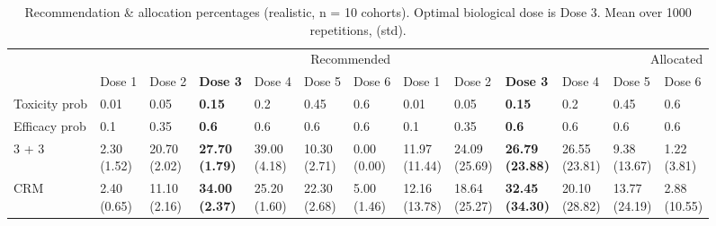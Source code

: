 \begin{table}[H]
\centering
\caption{Recommendation \& allocation percentages (realistic, n = 10 cohorts). Optimal biological dose is Dose 3. Mean over 1000 repetitions, (std).}
\label{tab:real_table2}
\begin{tabular}{lllllllllllll}
\toprule
 & \multicolumn{6}{r}{Recommended} & \multicolumn{6}{r}{Allocated} \\
 & Dose 1 & Dose 2 & \bfseries Dose 3 & Dose 4 & Dose 5 & Dose 6 & Dose 1 & Dose 2 & \bfseries Dose 3 & Dose 4 & Dose 5 & Dose 6 \\
\midrule
Toxicity prob & 0.01 & 0.05 & {\cellcolor[HTML]{C8E6C9}} \bfseries 0.15 & 0.2 & 0.45 & 0.6 & 0.01 & 0.05 & {\cellcolor[HTML]{C8E6C9}} \bfseries 0.15 & 0.2 & 0.45 & 0.6 \\
Efficacy prob & 0.1 & 0.35 & {\cellcolor[HTML]{C8E6C9}} \bfseries 0.6 & 0.6 & 0.6 & 0.6 & 0.1 & 0.35 & {\cellcolor[HTML]{C8E6C9}} \bfseries 0.6 & 0.6 & 0.6 & 0.6 \\
3 + 3 & \makecell{2.30 \\ (1.52)} & \makecell{20.70 \\ (2.02)} & {\cellcolor[HTML]{C8E6C9}} \bfseries \makecell{27.70 \\ (1.79)} & \makecell{39.00 \\ (4.18)} & \makecell{10.30 \\ (2.71)} & \makecell{0.00 \\ (0.00)} & \makecell{11.97 \\ (11.44)} & \makecell{24.09 \\ (25.69)} & {\cellcolor[HTML]{C8E6C9}} \bfseries \makecell{26.79 \\ (23.88)} & \makecell{26.55 \\ (23.81)} & \makecell{9.38 \\ (13.67)} & \makecell{1.22 \\ (3.81)} \\
CRM & \makecell{2.40 \\ (0.65)} & \makecell{11.10 \\ (2.16)} & {\cellcolor[HTML]{C8E6C9}} \bfseries \makecell{34.00 \\ (2.37)} & \makecell{25.20 \\ (1.60)} & \makecell{22.30 \\ (2.68)} & \makecell{5.00 \\ (1.46)} & \makecell{12.16 \\ (13.78)} & \makecell{18.64 \\ (25.27)} & {\cellcolor[HTML]{C8E6C9}} \bfseries \makecell{32.45 \\ (34.30)} & \makecell{20.10 \\ (28.82)} & \makecell{13.77 \\ (24.19)} & \makecell{2.88 \\ (10.55)} \\

\end{tabular}
\end{table}
